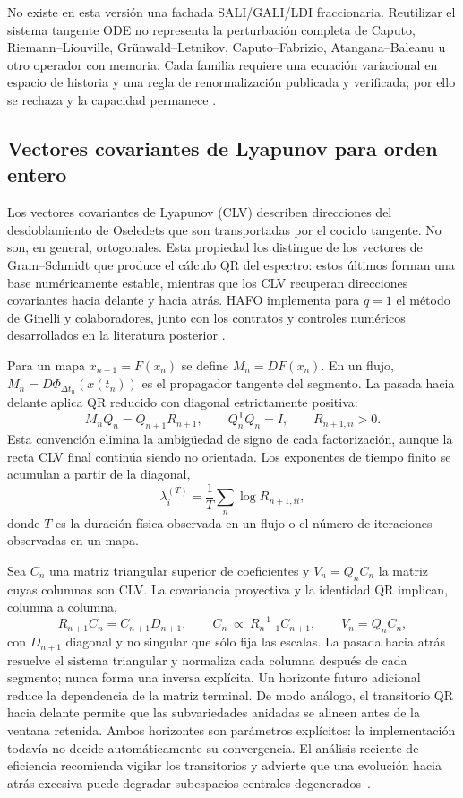 No existe en esta versión una fachada SALI/GALI/LDI fraccionaria. Reutilizar el
sistema tangente ODE no representa la perturbación completa de Caputo,
Riemann--Liouville, Grünwald--Letnikov, Caputo--Fabrizio,
Atangana--Baleanu u otro operador con memoria. Cada familia requiere una
ecuación variacional en espacio de historia y una regla de renormalización
publicada y verificada; por ello 
 se rechaza y la capacidad permanece
.

\subsection{Vectores covariantes de Lyapunov para orden entero}
\label{sec:clv-integer}

Los vectores covariantes de Lyapunov (CLV) describen direcciones del
desdoblamiento de Oseledets que son transportadas por el cociclo tangente. No
son, en general, ortogonales. Esta propiedad los distingue de los vectores de
Gram--Schmidt que produce el cálculo QR del espectro: estos últimos forman una
base numéricamente estable, mientras que los CLV recuperan direcciones
covariantes hacia delante y hacia atrás. HAFO implementa para $q=1$ el método
de Ginelli y colaboradores, junto con los contratos y controles numéricos
desarrollados en la literatura posterior
\cite{GinelliEtAl2007CLV,WolfeSamelson2007LyapunovVectors,
KuptsovParlitz2012CLV,FroylandEtAl2013CLVComparison,
GinelliEtAl2013CLVReview}.

Para un mapa $x_{n+1}=F(x_n)$ se define $M_n=DF(x_n)$. En un flujo,
$M_n=D\Phi_{\Delta t_n}(x(t_n))$ es el propagador tangente del segmento. La
pasada hacia delante aplica QR reducido con diagonal estrictamente positiva:
\[
 M_n Q_n=Q_{n+1}R_{n+1},
 \qquad Q_n^{\mathsf T}Q_n=I,
 \qquad R_{n+1,ii}>0.
\]
Esta convención elimina la ambigüedad de signo de cada factorización, aunque
la recta CLV final continúa siendo no orientada. Los exponentes de tiempo
finito se acumulan a partir de la diagonal,
\[
 \lambda_i^{(T)}=\frac{1}{T}
 \sum_n\log R_{n+1,ii},
\]
donde $T$ es la duración física observada en un flujo o el número de
iteraciones observadas en un mapa.

Sea $C_n$ una matriz triangular superior de coeficientes y
$V_n=Q_nC_n$ la matriz cuyas columnas son CLV. La covariancia proyectiva y la
identidad QR implican, columna a columna,
\[
 R_{n+1}C_n=C_{n+1}D_{n+1},
 \qquad
 C_n\ \propto\ R_{n+1}^{-1}C_{n+1},
 \qquad
 V_n=Q_nC_n,
\]
con $D_{n+1}$ diagonal y no singular que sólo fija las escalas. La pasada
hacia atrás resuelve el sistema triangular y normaliza cada columna después
de cada segmento; nunca forma una inversa explícita. Un horizonte futuro
adicional reduce la dependencia de la matriz terminal. De modo análogo, el
transitorio QR hacia delante permite que las subvariedades anidadas se
alineen antes de la ventana retenida. Ambos horizontes son parámetros
explícitos: la implementación todavía no decide automáticamente su
convergencia. El análisis reciente de eficiencia recomienda vigilar los
transitorios y advierte que una evolución hacia atrás excesiva puede degradar
subespacios centrales degenerados~\cite{DuPlessisHillebrandSkokos2026CLV}.

